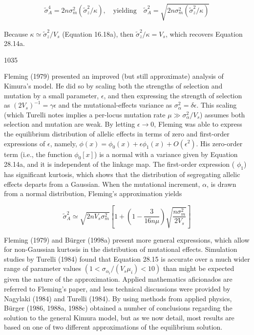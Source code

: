 \documentclass{article}
\begin{document}
\begin{equation}
\begin{align*}\widetilde\sigma^4_A=2n\sigma^2_m(\widetilde\sigma^2_z/\kappa),\quad\textrm{yielding}\quad\widetilde\sigma^2_A=\sqrt{2n\sigma^2_m(\widetilde\sigma^2_z/\kappa)}\end{align*}
\tag{28.14e}
\label{eq:28_14e}
\end{equation}

Because  $ \kappa \simeq \widetilde{\sigma}_z^2 / V_s $ (Equation 16.18a), then  $ \widetilde{\sigma}_z^2 / \kappa = V_s $, which recovers Equation 28.14a.

1035

Fleming (1979) presented an improved (but still approximate) analysis of Kimura's model. He did so by scaling both the strengths of selection and mutation by a small parameter,  $ \epsilon $, and then expressing the strength of selection as  $ (2V_s)^{-1} = \gamma \epsilon $ and the mutational-effects variance as  $ \sigma_{\alpha}^2 = \delta \epsilon $. This scaling (which Turelli notes implies a per-locus mutation rate  $ \mu \gg \sigma_{\alpha}^2 / V_s $) assumes both selection and mutation are weak. By letting  $ \epsilon \to 0 $, Fleming was able to express the equilibrium distribution of allelic effects in terms of zero and first-order expressions of  $ \epsilon $, namely,  $ \phi(x) = \phi_0(x) + \epsilon \phi_1(x) + O(\epsilon^2) $. His zero-order term (i.e., the function  $ \phi_0[x] $) is a normal with a variance given by Equation 28.14a, and it is independent of the linkage map. The first-order expression ( $ \phi_1 $) has significant kurtosis, which shows that the distribution of segregating allelic effects departs from a Gaussian. When the mutational increment,  $ \alpha $, is drawn from a normal distribution, Fleming's approximation yields

\begin{equation}
\widetilde{\sigma}_{A}^{2}\simeq\sqrt{2n V_{s}\sigma_{m}^{2}}\left[1+\left(1-\frac{3}{16n\mu}\right)\sqrt{\frac{n\sigma_{m}^{2}}{2V_{s}}}\right]
\tag{28.15}
\label{eq:28_15}
\end{equation}

Fleming (1979) and Bürger (1998a) present more general expressions, which allow for non-Gaussian kurtosis in the distribution of mutational effects. Simulation studies by Turelli (1984) found that Equation 28.15 is accurate over a much wider range of parameter values  $ (1 < \sigma_{\alpha_i} / (V_s \mu_i) < 10) $ than might be expected given the nature of the approximation. Applied mathematics aficionados are referred to Fleming's paper, and less technical discussions were provided by Nagylaki (1984) and Turelli (1984). By using methods from applied physics, Bürger (1986, 1988a, 1988c) obtained a number of conclusions regarding the solution to the general Kimura model, but as we now detail, most results are based on one of two different approximations of the equilibrium solution.
\end{document}
